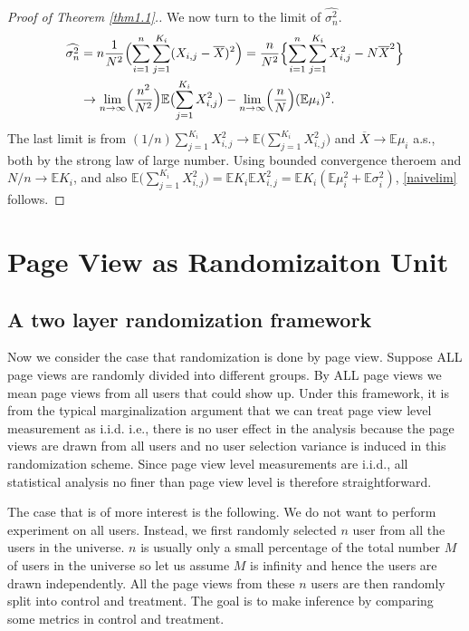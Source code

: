 \documentclass[10pt]{article}
\newcommand{\wht}{\widehat}
\newcommand{\bbe}{\mathbb{E}}
\newcommand{\xbar}{\overline{X}}
\newcommand{\Xij}{X_{i,j}}
\newcommand{\naiveest}{\wht{\sigma^2_n}}
\begin{document}
\begin{proof}[Proof of Theorem \ref{thm1.1}.]
We now turn to the limit of $\naiveest$. 
\begin{align*}
 \naiveest &= n \frac{1}{N^2} \Bigl (\sum_{i=1}^n \sum_{j=1}^{K_i} (X_{i,j}-\overline{X})^2 \Bigr )= \frac{n}{N^2} \Bigl \{  \sum_{i=1}^n \sum_{j=1}^{K_i} X_{i,j}^2 - N \xbar^2 \Bigr\}\\
&\to   \lim_{n\to \infty} \Bigl(\frac{n^2}{N^2}\Bigr) \bbe \bigl(\sum_{j=1}^{K_i} \Xij^2 \bigr) -   \lim_{n\to \infty} \Bigl(\frac{n}{N}\Bigr) (\bbe \mu_i)^2 .
\end{align*}
The last limit is from $(1/n) \sum_{j=1}^{K_i} X_{i,j}^2 \to \bbe \bigl(\sum_{j=1}^{K_i} \Xij^2 \bigr)$ and $\xbar \to \bbe \mu_i$ a.s., both by the strong law of large number.
Using bounded convergence theroem and $N/n \to \bbe K_i$, and also $\bbe \bigl(\sum_{j=1}^{K_i} \Xij^2 \bigr)  = \bbe K_i \bbe X_{i,j}^2 = \bbe K_i (\bbe \mu_i^2 + \bbe \sigma_i^2)$,
\eqref{naivelim} follows.
\end{proof}




\section{Page View as Randomizaiton Unit}\label{page}
\subsection{A two layer randomization framework}
Now we consider the case that randomization is done by page view. Suppose ALL page views are randomly divided into different groups. By ALL page views we mean page views from all users that could show up. Under this framework, it is from the typical marginalization argument that we can treat page view level measurement as i.i.d. i.e., there is no user effect in the analysis because the page views are drawn from all users and no user selection variance is induced in this randomization scheme. Since page view level measurements are i.i.d., all statistical analysis no finer than page view level is therefore straightforward. 

The case that is of more interest is the following. We do not want to perform experiment on all users. Instead, we first randomly selected $n$ user from all the users in the universe. $n$ is usually only a small percentage of the total number $M$ of users in the universe so let us assume $M$ is infinity and hence the users are drawn independently. All the page views from these $n$ users are then randomly split into control and treatment. The goal is to make inference by comparing some metrics in control and treatment. 
\end{document}
